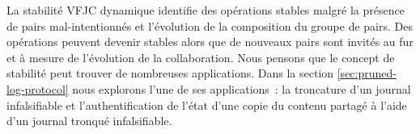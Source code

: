 La stabilité \acl{VFJC} dynamique identifie des opérations stables malgré la présence de pairs mal-intentionnés et l'évolution de la composition du groupe de pairs.
Des opérations peuvent devenir stables alors que de nouveaux pairs sont invités au fur et à mesure de l'évolution de la collaboration.
Nous pensons que le concept de stabilité peut trouver de nombreuses applications.
Dans la section \autoref{sec:pruned-log-protocol} nous explorons l'une de ses applications~: la troncature d'un journal infalsifiable et l'authentification de l'état d'une copie du contenu partagé à l'aide d'un journal tronqué infalsifiable.

%
%
%
%
%
%


